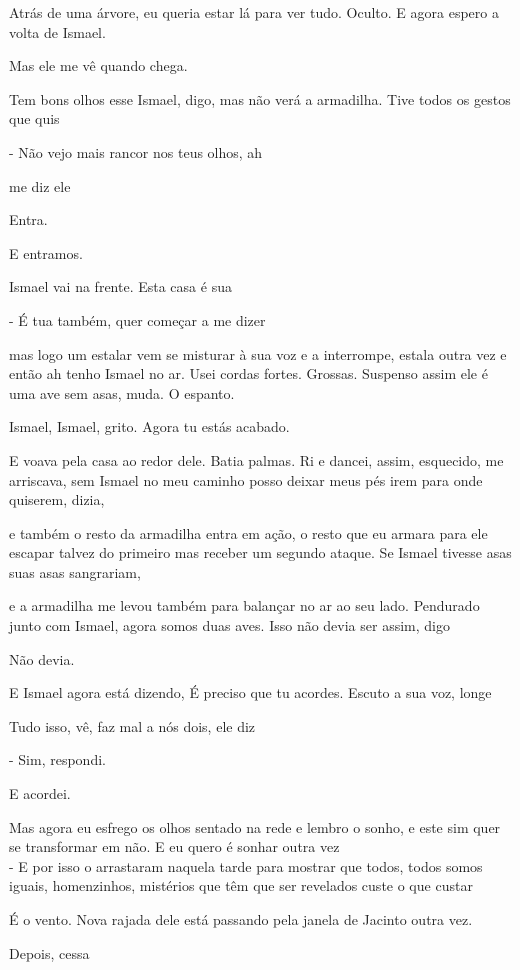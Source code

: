 Atrás de uma árvore, eu queria estar lá para ver tudo. Oculto. E agora
espero a volta de Ismael.

Mas ele me vê quando chega.

Tem bons olhos esse Ismael, digo, mas não verá a armadilha. Tive todos
os gestos que quis

- Não vejo mais rancor nos teus olhos, ah

me diz ele

Entra.

E entramos.

Ismael vai na frente. Esta casa é sua

- É tua também, quer começar a me dizer

mas logo um estalar vem se misturar à sua voz e a interrompe, estala
outra vez e então ah tenho Ismael no ar. Usei cordas fortes. Grossas.
Suspenso assim ele é uma ave sem asas, muda. O espanto.

Ismael, Ismael, grito. Agora tu estás acabado.

E voava pela casa ao redor dele. Batia palmas. Ri e dancei, assim,
esquecido, me arriscava, sem Ismael no meu caminho posso deixar meus pés
irem para onde quiserem, dizia,

e também o resto da armadilha entra em ação, o resto que eu armara para
ele escapar talvez do primeiro mas receber um segundo ataque. Se Ismael
tivesse asas suas asas sangrariam,

e a armadilha me levou também para balançar no ar ao seu lado. Pendurado
junto com Ismael, agora somos duas aves. Isso não devia ser assim, digo

Não devia.

E Ismael agora está dizendo, É preciso que tu acordes. Escuto a sua voz,
longe

Tudo isso, vê, faz mal a nós dois, ele diz

- Sim, respondi.

E acordei.

Mas agora eu esfrego os olhos sentado na rede e lembro o sonho, e este
sim quer se transformar em não. E eu quero é sonhar outra vez\\

- E por isso o arrastaram naquela tarde para mostrar que todos, todos
somos iguais, homenzinhos, mistérios que têm que ser revelados custe o
que custar

É o vento. Nova rajada dele está passando pela janela de Jacinto outra
vez.

Depois, cessa

